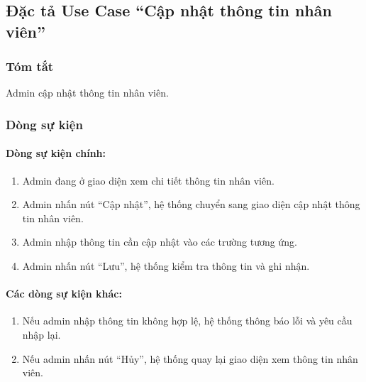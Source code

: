 \subsection{Đặc tả Use Case ``Cập nhật thông tin nhân viên''}

\subsubsection{Tóm tắt}
Admin cập nhật thông tin nhân viên.

\subsubsection{Dòng sự kiện}
\paragraph{\textbf{Dòng sự kiện chính:}}
\begin{enumerate}
  \item Admin đang ở giao diện xem chi tiết thông tin nhân viên.
  \item Admin nhấn nút ``Cập nhật'', hệ thống chuyển sang giao diện cập nhật thông tin nhân viên.
  \item Admin nhập thông tin cần cập nhật vào các trường tương ứng.
  \item Admin nhấn nút ``Lưu'', hệ thống kiểm tra thông tin và ghi nhận.
\end{enumerate}

\paragraph{\textbf{Các dòng sự kiện khác:}}
\begin{enumerate}
  \item Nếu admin nhập thông tin không hợp lệ, hệ thống thông báo lỗi và yêu cầu nhập lại.
  \item Nếu admin nhấn nút ``Hủy'', hệ thống quay lại giao diện xem thông tin nhân viên.
\end{enumerate}


